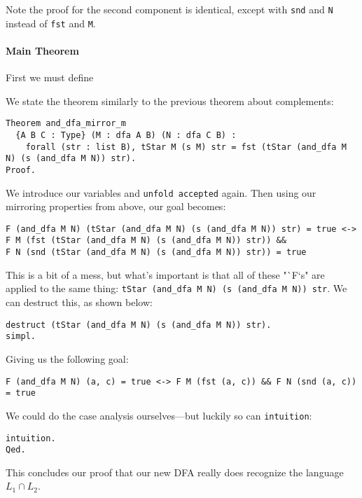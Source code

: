 Note the proof for the second component is identical, except with \texttt{snd} and \texttt{N} instead of \texttt{fst} and \texttt{M}.

\paragraph{Main Theorem}

First we must define

We state the theorem similarly to the previous theorem about complements:

\begin{verbatim}
Theorem and_dfa_mirror_m
  {A B C : Type} (M : dfa A B) (N : dfa C B) :
    forall (str : list B), tStar M (s M) str = fst (tStar (and_dfa M N) (s (and_dfa M N)) str).
Proof.
\end{verbatim}

We introduce our variables and \texttt{unfold accepted} again.
Then using our mirroring properties from above, our goal becomes:

\begin{verbatim}
F (and_dfa M N) (tStar (and_dfa M N) (s (and_dfa M N)) str) = true <->
F M (fst (tStar (and_dfa M N) (s (and_dfa M N)) str)) &&
F N (snd (tStar (and_dfa M N) (s (and_dfa M N)) str)) = true
\end{verbatim}

This is a bit of a mess, but what's important is that all of these "`F`s" are applied to the same thing: \texttt{tStar (and_dfa M N) (s (and_dfa M N)) str}.
We can destruct this, as shown below:

\begin{verbatim}
destruct (tStar (and_dfa M N) (s (and_dfa M N)) str).
simpl.
\end{verbatim}

Giving us the following goal:

\begin{verbatim}
F (and_dfa M N) (a, c) = true <-> F M (fst (a, c)) && F N (snd (a, c)) = true
\end{verbatim}

We could do the case analysis ourselves---but luckily so can \texttt{intuition}:

\begin{verbatim}
intuition.
Qed.
\end{verbatim}

This concludes our proof that our new DFA really does recognize the language $L_1 \cap L_2$.

